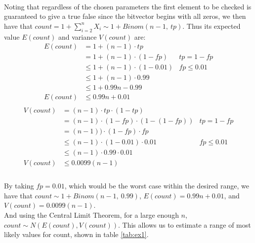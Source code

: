 \documentclass[../main.tex]{subfiles}
\begin{document}
\paragraph{} Noting that regardless of the chosen parameters the first element to be checked is guaranteed to give a true false since the bitvector begins with all zeros, we then have that \(count = 1 + \sum_{i = 2}^{n}X_{i} \sim 1 + Binom(n - 1,\ tp)\). Thus its expected value \(E(count)\) and variance \(V(count)\) are:
\begin{align*}
  E(count) &= 1 + (n - 1) \cdot tp \\
           &= 1 + (n - 1) \cdot (1 - fp) & tp = 1 - fp \\
           &\leq 1 + (n - 1) \cdot (1 - 0.01) & fp \leq 0.01 \\
           &\leq 1 + (n - 1) \cdot 0.99 \\
           &\leq 1 + 0.99n - 0.99 \\
  E(count) &\leq 0.99n + 0.01 \\
\end{align*}
\begin{align*}
  V(count) &= (n - 1) \cdot tp \cdot (1 - tp) \\
           &= (n - 1) \cdot (1 - fp) \cdot (1 - (1 - fp)) & tp = 1 - fp \\
           &= (n - 1)) \cdot (1 - fp) \cdot fp \\
           &\leq (n - 1) \cdot (1 - 0.01) \cdot 0.01 & fp \leq 0.01 \\
           &\leq (n - 1) \cdot 0.99 \cdot 0.01 \\
  V(count) &\leq 0.0099(n - 1) \\
\end{align*}

\paragraph{} By taking \(fp = 0.01\), which would be the worst case within the desired range, we have that \(count \sim 1 + Binom(n-1,\ 0.99)\), \(E(count) = 0.99n + 0.01\), and \(V(count) = 0.0099(n-1)\). \\
And using the Central Limit Theorem, for a large enough \(n\), \(count \sim N(E(count), V(count))\). This allows us to estimate a range of most likely values for count, shown in table \ref{tab:ex1}.
\end{document}
